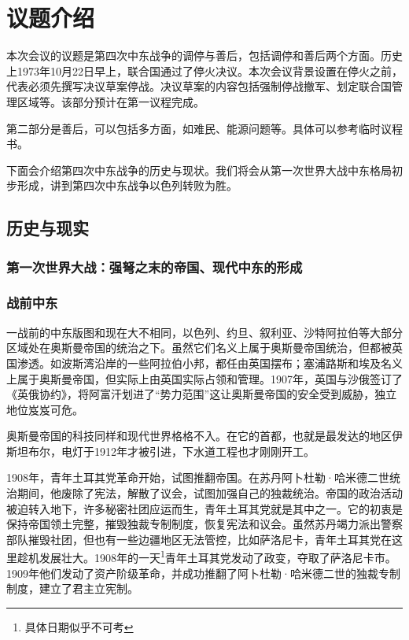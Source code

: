 \documentclass{article}
\begin{document}
\section{议题介绍}
本次会议的议题是第四次中东战争的调停与善后，包括调停和善后两个方面。历史上1973年10月22日早上，联合国通过了停火决议。本次会议背景设置在停火之前，代表必须先撰写决议草案停战。决议草案的内容包括强制停战撤军、划定联合国管理区域等。该部分预计在第一议程完成。

第二部分是善后，可以包括多方面，如难民、能源问题等。具体可以参考临时议程书。

下面会介绍第四次中东战争的历史与现状。我们将会从第一次世界大战中东格局初步形成，讲到第四次中东战争以色列转败为胜。
\subsection{历史与现实}
\subsubsection{第一次世界大战：强弩之末的帝国、现代中东的形成}
\subsubsection{战前中东}
一战前的中东版图和现在大不相同，以色列、约旦、叙利亚、沙特阿拉伯等大部分区域处在奥斯曼帝国的统治之下。虽然它们名义上属于奥斯曼帝国统治，但都被英国渗透。如波斯湾沿岸的一些阿拉伯小邦，都任由英国摆布；塞浦路斯和埃及名义上属于奥斯曼帝国，但实际上由英国实际占领和管理。1907年，英国与沙俄签订了《英俄协约》，将阿富汗划进了“势力范围”这让奥斯曼帝国的安全受到威胁，独立地位岌岌可危。

奥斯曼帝国的科技同样和现代世界格格不入。在它的首都，也就是最发达的地区伊斯坦布尔，电灯于1912年才被引进，下水道工程也才刚刚开工。

1908年，青年土耳其党革命开始，试图推翻帝国。在苏丹阿卜杜勒·哈米德二世统治期间，他废除了宪法，解散了议会，试图加强自己的独裁统治。帝国的政治活动被迫转入地下，许多秘密社团应运而生，青年土耳其党就是其中之一。它的初衷是保持帝国领土完整，摧毁独裁专制制度，恢复宪法和议会。虽然苏丹竭力派出警察部队摧毁社团，但也有一些边疆地区无法管控，比如萨洛尼卡，青年土耳其党在这里趁机发展壮大。1908年的一天\footnote{具体日期似乎不可考}青年土耳其党发动了政变，夺取了萨洛尼卡市。1909年他们发动了资产阶级革命，并成功推翻了阿卜杜勒·哈米德二世的独裁专制制度，建立了君主立宪制。
\end{document}
